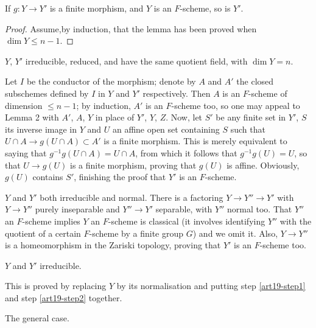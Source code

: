 \begin{lem}\label{art19-lem3}
If $g : Y \to Y'$ is a finite morphism, and $Y$ is an $F$-scheme, so is $Y'$.
\end{lem}

\begin{proof}
Assume,\pageoriginale by induction, that the lemma has been proved when $\dim Y \leqslant n -1$.
\end{proof}

\begin{step}\label{art19-step1}
$Y$, $Y'$ irreducible, reduced, and have the same quotient field, with $\dim Y = n$.
\end{step}

Let $I$ be the conductor of the morphism; denote by $A$ and $A'$ the closed subschemes  defined by $I$ in $Y$ and $Y'$ respectively. Then $A$ is an $F$-scheme of dimension $\leqslant n -1$; by induction, $A'$ is an $F$-scheme too, so one may appeal to Lemma 2 with $A'$, $A$, $Y$ in place of $Y'$, $Y$, $Z$. Now, let $S'$ be any finite set in $Y'$, $S$ its inverse image in $Y$ and $U$ an affine open set containing $S$ such that $U \cap A \to g(U \cap A) \subset A'$ is a finite morphism. This is merely equivalent to saying that $g^{-1} g(U \cap A) = U \cap A$, from which it follows that $g^{-1} g(U) = U$, so that $U \to g(U)$ is a finite morphism, proving that $g(U)$ is affine. Obviously, $g(U)$ contains $S'$, finishing the proof that $Y'$ is an $F$-scheme.

\begin{step}\label{art19-step2}
$Y$ and $Y'$ both irreducible and normal. There is a factoring $Y \to Y'' \to Y'$ with $Y \to Y''$ purely inseparable and $Y'' \to Y'$ separable, with $Y''$ normal too. That $Y''$ an $F$-scheme implies $Y$ an $F$-scheme is classical (it involves identifying $Y''$ with the quotient of a certain $F$-scheme by a finite group $G$) and we omit it. Also, $Y \to Y''$ is a homeomorphism in the Zariski topology, proving that $Y'$ is an $F$-scheme too.
\end{step}

\begin{step}\label{art19-step3}
$Y$ and $Y'$ irreducible.
\end{step}

This is proved by replacing $Y$ by its normalisation and putting step \ref{art19-step1} and step \ref{art19-step2}
 together.

\begin{step}\label{art19-step4}
The general case.
\end{step}

